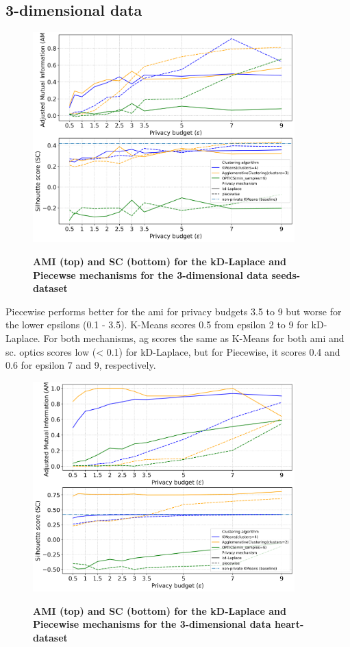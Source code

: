 \subsection{3-dimensional data}
\begin{figure}[H]
  \centering
  \caption{\textbf{AMI (top) and SC (bottom) for the kD-Laplace and Piecewse mechanisms for the 3-dimensional data seeds-dataset}}
  \includegraphics[width=0.9\textwidth]{Results/kd-laplace/kd-Laplace/seeds-dataset/ami-and-sc_3_dimensions.png}
  \label{fig:validation-seeds-dataset_comparison_3d-laplace}
\end{figure}
Piecewise performs better for the \gls{ami} for privacy budgets 3.5 to 9 but worse for the lower epsilons (0.1 - 3.5).
K-Means scores 0.5 from epsilon 2 to 9 for kD-Laplace.
For both mechanisms, \gls{ag} scores the same as K-Means for both \gls{ami} and \gls{sc}.
\gls{optics} scores low (< 0.1) for kD-Laplace, but for Piecewise, it scores 0.4 and 0.6 for epsilon 7 and 9, respectively.
\newpage
\begin{figure}[H]
  \centering

  \caption{\textbf{AMI (top) and SC (bottom) for the kD-Laplace and Piecewise mechanisms for the 3-dimensional data heart-dataset}}
  \includegraphics[width=0.9\textwidth]{Results/kd-laplace/kd-Laplace/heart-dataset/ami-and-sc_3_dimensions.png}
  \label{fig:validation-heart-dataset_comparison_3d-laplace}
\end{figure}

